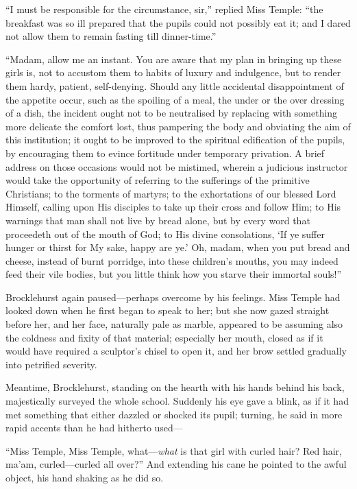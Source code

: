 \enquote{I must be responsible for the circumstance, sir,} replied Miss
Temple: \enquote{the breakfast was so ill prepared that the pupils could
not possibly eat it; and I dared not allow them to remain fasting till
dinner-time.}

\enquote{Madam, allow me an instant. You are aware that my plan in
bringing up these girls is, not to accustom them to habits of luxury and
indulgence, but to render them hardy, patient, self-denying. Should any
little accidental disappointment of the appetite occur, such as the
spoiling of a meal, the under or the over dressing of a dish, the
incident ought not to be neutralised by replacing with something more
delicate the comfort lost, thus pampering the body and obviating the aim
of this institution; it ought to be improved to the spiritual
edification of the pupils, by encouraging them to evince fortitude under
temporary privation. A brief address on those occasions would not be
mistimed, wherein a judicious instructor would take the opportunity of
referring to the sufferings of the primitive Christians; to the torments
of martyrs; to the exhortations of our blessed Lord Himself, calling
upon His disciples to take up their cross and follow Him; to His
warnings that man shall not live by bread alone, but by every word that
proceedeth out of the mouth of God; to His divine consolations, \enquote{If ye
suffer hunger or thirst for My sake, happy are ye.} Oh, madam, when you
put bread and cheese, instead of burnt porridge, into these children's
mouths, you may indeed feed their vile bodies, but you little think how
you starve their immortal souls!}

\Mr{} Brocklehurst again paused---perhaps overcome by his feelings. Miss
Temple had looked down when he first began to speak to her; but she now
gazed straight before her, and her face, naturally pale as marble,
appeared to be assuming also the coldness and fixity of that material;
especially her mouth, closed as if it would have required a sculptor's
chisel to open it, and her brow settled gradually into petrified
severity.

Meantime, \Mr{} Brocklehurst, standing on the hearth with his hands behind
his back, majestically surveyed the whole school. Suddenly his eye gave
a blink, as if it had met something that either dazzled or shocked its
pupil; turning, he said in more rapid accents than he had hitherto
used---

\enquote{Miss Temple, Miss Temple, what---\emph{what} is that girl with curled
hair? Red hair, ma'am, curled---curled all over?} And extending his
cane he pointed to the awful object, his hand shaking as he did so.

